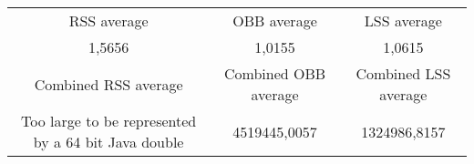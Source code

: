 \begin{tabular}{c|c|c}\\ 
RSS average & OBB average & LSS average\\ 
1,5656 & 1,0155 & 1,0615\\ 
\hline 
Combined RSS average & Combined OBB average & Combined LSS average\\ 
Too large to be represented by a 64 bit Java double & 4519445,0057 & 1324986,8157\\ 
\end{tabular}